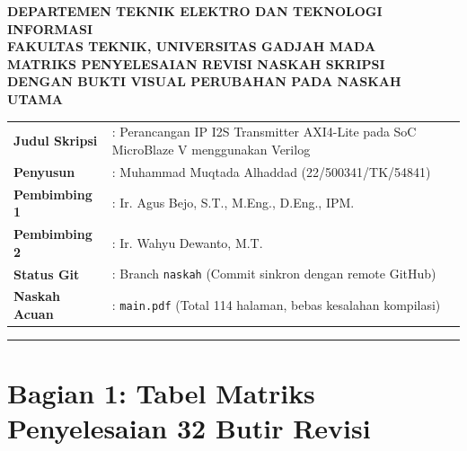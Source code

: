 \documentclass[11pt,a4paper]{article}
\begin{document}
\begin{center}
    {\large \textbf{DEPARTEMEN TEKNIK ELEKTRO DAN TEKNOLOGI INFORMASI}}\\[0.2em]
    {\large \textbf{FAKULTAS TEKNIK, UNIVERSITAS GADJAH MADA}}\\[0.8em]
    {\Large \textbf{\color{ugmblue}MATRIKS PENYELESAIAN REVISI NASKAH SKRIPSI}}\\[0.3em]
    {\large \textbf{DENGAN BUKTI VISUAL PERUBAHAN PADA NASKAH UTAMA}}\\[1em]
\end{center}

\noindent\begin{tabular}{@{}ll@{}}
    \textbf{Judul Skripsi} & : Perancangan IP I2S Transmitter AXI4-Lite pada SoC MicroBlaze V menggunakan Verilog \\
    \textbf{Penyusun}      & : Muhammad Muqtada Alhaddad (22/500341/TK/54841) \\
    \textbf{Pembimbing 1}  & : Ir. Agus Bejo, S.T., M.Eng., D.Eng., IPM. \\
    \textbf{Pembimbing 2}  & : Ir. Wahyu Dewanto, M.T. \\
    \textbf{Status Git}    & : Branch \texttt{naskah} (Commit sinkron dengan remote GitHub) \\
    \textbf{Naskah Acuan}  & : \texttt{main.pdf} (Total 114 halaman, bebas kesalahan kompilasi)
\end{tabular}

\vspace{1em}
\hrule
\vspace{1em}

\section*{Bagian 1: Tabel Matriks Penyelesaian 32 Butir Revisi}
\end{document}
